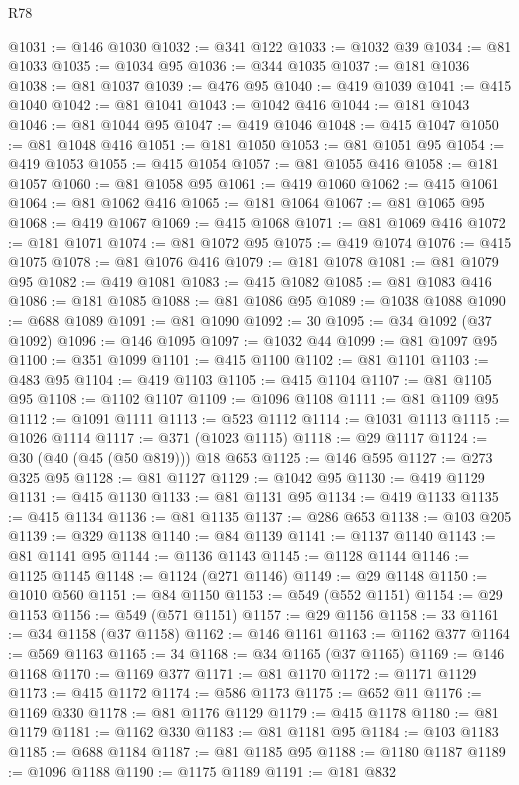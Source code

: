 \begin{lexlean}{R78}
\begin{coremodule}
@1031 := @146 @1030
@1032 := @341 @122
@1033 := @1032 @39
@1034 := @81 @1033
@1035 := @1034 @95
@1036 := @344 @1035
@1037 := @181 @1036
@1038 := @81 @1037
@1039 := @476 @95
@1040 := @419 @1039
@1041 := @415 @1040
@1042 := @81 @1041
@1043 := @1042 @416
@1044 := @181 @1043
@1046 := @81 @1044 @95
@1047 := @419 @1046
@1048 := @415 @1047
@1050 := @81 @1048 @416
@1051 := @181 @1050
@1053 := @81 @1051 @95
@1054 := @419 @1053
@1055 := @415 @1054
@1057 := @81 @1055 @416
@1058 := @181 @1057
@1060 := @81 @1058 @95
@1061 := @419 @1060
@1062 := @415 @1061
@1064 := @81 @1062 @416
@1065 := @181 @1064
@1067 := @81 @1065 @95
@1068 := @419 @1067
@1069 := @415 @1068
@1071 := @81 @1069 @416
@1072 := @181 @1071
@1074 := @81 @1072 @95
@1075 := @419 @1074
@1076 := @415 @1075
@1078 := @81 @1076 @416
@1079 := @181 @1078
@1081 := @81 @1079 @95
@1082 := @419 @1081
@1083 := @415 @1082
@1085 := @81 @1083 @416
@1086 := @181 @1085
@1088 := @81 @1086 @95
@1089 := @1038 @1088
@1090 := @688 @1089
@1091 := @81 @1090
@1092 := 30
@1095 := @34 @1092 (@37 @1092)
@1096 := @146 @1095
@1097 := @1032 @44
@1099 := @81 @1097 @95
@1100 := @351 @1099
@1101 := @415 @1100
@1102 := @81 @1101
@1103 := @483 @95
@1104 := @419 @1103
@1105 := @415 @1104
@1107 := @81 @1105 @95
@1108 := @1102 @1107
@1109 := @1096 @1108
@1111 := @81 @1109 @95
@1112 := @1091 @1111
@1113 := @523 @1112
@1114 := @1031 @1113
@1115 := @1026 @1114
@1117 := @371 (@1023 @1115)
@1118 := @29 @1117
@1124 := @30 (@40 (@45 (@50 @819))) @18 @653
@1125 := @146 @595
@1127 := @273 @325 @95
@1128 := @81 @1127
@1129 := @1042 @95
@1130 := @419 @1129
@1131 := @415 @1130
@1133 := @81 @1131 @95
@1134 := @419 @1133
@1135 := @415 @1134
@1136 := @81 @1135
@1137 := @286 @653
@1138 := @103 @205
@1139 := @329 @1138
@1140 := @84 @1139
@1141 := @1137 @1140
@1143 := @81 @1141 @95
@1144 := @1136 @1143
@1145 := @1128 @1144
@1146 := @1125 @1145
@1148 := @1124 (@271 @1146)
@1149 := @29 @1148
@1150 := @1010 @560
@1151 := @84 @1150
@1153 := @549 (@552 @1151)
@1154 := @29 @1153
@1156 := @549 (@571 @1151)
@1157 := @29 @1156
@1158 := 33
@1161 := @34 @1158 (@37 @1158)
@1162 := @146 @1161
@1163 := @1162 @377
@1164 := @569 @1163
@1165 := 34
@1168 := @34 @1165 (@37 @1165)
@1169 := @146 @1168
@1170 := @1169 @377
@1171 := @81 @1170
@1172 := @1171 @1129
@1173 := @415 @1172
@1174 := @586 @1173
@1175 := @652 @11
@1176 := @1169 @330
@1178 := @81 @1176 @1129
@1179 := @415 @1178
@1180 := @81 @1179
@1181 := @1162 @330
@1183 := @81 @1181 @95
@1184 := @103 @1183
@1185 := @688 @1184
@1187 := @81 @1185 @95
@1188 := @1180 @1187
@1189 := @1096 @1188
@1190 := @1175 @1189
@1191 := @181 @832

\end{coremodule}
\end{lexlean}
